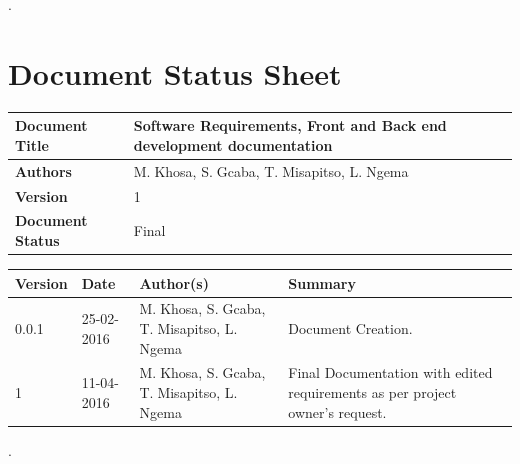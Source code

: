 \documentclass[10pt,onecolumn]{MainDocument}
\begin{document}
\begin{titlepage}
		\vfill %
		
	\end{titlepage}
	
	

	\pagestyle{plain}.
	\tableofcontents 
	
	\newpage
	
	
	
\section*{Document Status Sheet}
	
	\begin{center}
		\begin{tabular}{ | p{5cm} | p{7cm} |}
			\hline
			\textbf{Document Title}& Software Requirements, Front and Back end development documentation \\ \hline
			\textbf{Authors} & M.$\;$Khosa, S.$\;$Gcaba, T.$\;$Misapitso, L.$\;$Ngema \\ \hline
			\textbf{Version} & 1 \\ \hline
			\textbf{Document Status} & Final  \\ \hline
			
		\end{tabular}
	\end{center}
	
	
	\begin{center}
		\begin{tabular}{ | p{2cm} | p{3cm} | p{5cm} | p{5cm} |}
			\hline
			\textbf{Version}& \textbf{Date}& \textbf{Author(s)} & \textbf{Summary} \\ \hline
			0.0.1 & 25-02-2016 & M.$\;$Khosa, S.$\;$Gcaba, T.$\;$Misapitso, L.$\;$Ngema& Document Creation. \\ \hline
		    1 & 11-04-2016 & M.$\;$Khosa, S.$\;$Gcaba, T.$\;$Misapitso, L.$\;$Ngema& Final Documentation with edited requirements as per project owner's request. \\ \hline
		\end{tabular}
	\end{center}
	
	\newpage
	
	
	\pagestyle{plain}.

%
\end{document}
